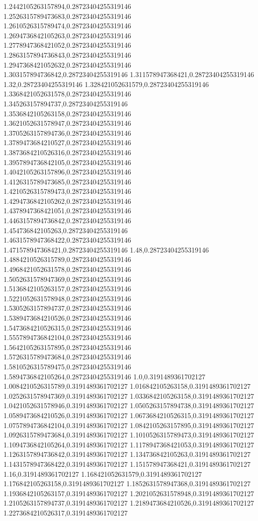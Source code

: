 1.2442105263157894,0.28723404255319146
1.2526315789473683,0.28723404255319146
1.2610526315789474,0.28723404255319146
1.2694736842105263,0.28723404255319146
1.2778947368421052,0.28723404255319146
1.2863157894736843,0.28723404255319146
1.2947368421052632,0.28723404255319146
1.303157894736842,0.28723404255319146
1.311578947368421,0.28723404255319146
1.32,0.28723404255319146
1.328421052631579,0.28723404255319146
1.3368421052631578,0.28723404255319146
1.345263157894737,0.28723404255319146
1.3536842105263158,0.28723404255319146
1.3621052631578947,0.28723404255319146
1.3705263157894736,0.28723404255319146
1.3789473684210527,0.28723404255319146
1.3873684210526316,0.28723404255319146
1.3957894736842105,0.28723404255319146
1.4042105263157896,0.28723404255319146
1.4126315789473685,0.28723404255319146
1.4210526315789473,0.28723404255319146
1.4294736842105262,0.28723404255319146
1.4378947368421051,0.28723404255319146
1.4463157894736842,0.28723404255319146
1.454736842105263,0.28723404255319146
1.4631578947368422,0.28723404255319146
1.471578947368421,0.28723404255319146
1.48,0.28723404255319146
1.4884210526315789,0.28723404255319146
1.4968421052631578,0.28723404255319146
1.5052631578947369,0.28723404255319146
1.5136842105263157,0.28723404255319146
1.5221052631578948,0.28723404255319146
1.5305263157894737,0.28723404255319146
1.5389473684210526,0.28723404255319146
1.5473684210526315,0.28723404255319146
1.5557894736842104,0.28723404255319146
1.5642105263157895,0.28723404255319146
1.5726315789473684,0.28723404255319146
1.5810526315789475,0.28723404255319146
1.5894736842105264,0.28723404255319146
1.0,0.3191489361702127
1.0084210526315789,0.3191489361702127
1.016842105263158,0.3191489361702127
1.0252631578947369,0.3191489361702127
1.0336842105263158,0.3191489361702127
1.0421052631578946,0.3191489361702127
1.0505263157894738,0.3191489361702127
1.0589473684210526,0.3191489361702127
1.0673684210526315,0.3191489361702127
1.0757894736842104,0.3191489361702127
1.0842105263157895,0.3191489361702127
1.0926315789473684,0.3191489361702127
1.1010526315789473,0.3191489361702127
1.1094736842105264,0.3191489361702127
1.1178947368421053,0.3191489361702127
1.1263157894736842,0.3191489361702127
1.134736842105263,0.3191489361702127
1.1431578947368422,0.3191489361702127
1.151578947368421,0.3191489361702127
1.16,0.3191489361702127
1.168421052631579,0.3191489361702127
1.176842105263158,0.3191489361702127
1.1852631578947368,0.3191489361702127
1.1936842105263157,0.3191489361702127
1.2021052631578948,0.3191489361702127
1.2105263157894737,0.3191489361702127
1.2189473684210526,0.3191489361702127
1.2273684210526317,0.3191489361702127
